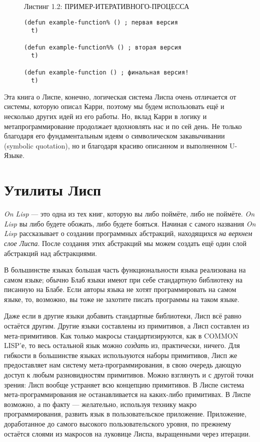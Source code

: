 \begin{figure}Листинг 1.2: ПРИМЕР-ИТЕРАТИВНОГО-ПРОЦЕССА\label{listing_1.2}
\listbegin
\begin{verbatim}
(defun example-function% () ; первая версия
  t)

(defun example-function%% () ; вторая версия
  t)

(defun example-function () ; финальная версия!
  t)
\end{verbatim}
\listend
\end{figure}

Эта книга о Лиспе, конечно, логическая система Лиспа очень отличается от системы, которую описал Карри, поэтому мы будем использовать ещё и несколько других идей из его работы. Но, вклад Карри в логику и метапрограммирование продолжает вдохновлять нас и по сей день. Не только благодаря его фундаментальным идеям о символическом закавычивании (symbolic quotation), но и благодаря красиво описанном и выполненном U-Языке.
\section{Утилиты Лисп}\label{section_the_lisp_utility}

\emph{On Lisp} --- это одна из тех книг, которую вы либо поймёте, либо не поймёте. \emph{On Lisp} вы либо будете обожать, либо будете бояться. Начиная с самого названия \emph{On Lisp} рассказывает о создании программных абстракций, находящихся \emph{на верхнем слое Лиспа}. После создания этих абстракций мы можем создать ещё один слой абстракций над абстракциями.

В большинстве языках большая часть функциональности языка реализована на самом языке; обычно Блаб языки имеют при себе стандартную библиотеку на писанную на Блабе. Если авторы языка не хотят программировать на самом языке, то, возможно, вы тоже не захотите писать программы на таком языке.

Даже если в другие языки добавить стандартные библиотеки, Лисп всё равно остаётся другим. Другие языки составлены из примитивов, а Лисп составлен из мета-примитивов. Как только макросы стандартизируются, как в COMMON LISP'е, то весь остальной язык можно \emph{создать} из, практически, ничего. Для гибкости в большинстве языках используются наборы примитивов, Лисп же предоставляет нам систему мета-программирования, в свою очередь дающую доступ к любым разновидностям примитивов. Можно взглянуть и с другой точки зрения: Лисп вообще устраняет всю концепцию примитивов. В Лиспе система мета-программирования не останавливается на каких-либо примитивах. В Лиспе возможно, а по факту --- желательно, используя технику макро программирования, развить язык в пользовательское приложение. Приложение, доработанное до самого высокого пользовательского уровня, по прежнему остаётся слоями из макросов на луковице Лиспа, выращенными через итерации.

